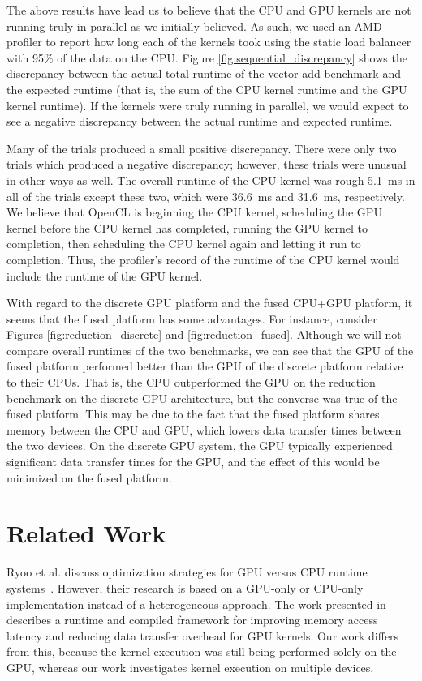 \documentclass[journal]{IEEEtran}
\begin{document}
The above results have lead us to believe that the CPU and GPU kernels are
not running truly in parallel as we initially believed.  As such, we used
an AMD profiler to report how long each of the kernels took using the static
load balancer with 95\% of the data on the CPU.  Figure \ref{fig:sequential_discrepancy}
shows the discrepancy between the actual total runtime of the vector add
benchmark and the expected runtime (that is, the sum of the CPU kernel runtime
and the GPU kernel runtime).  If the kernels were truly running in parallel,
we would expect to see a negative discrepancy between the actual runtime and
expected runtime.

Many of the trials produced a small positive discrepancy.  There were only
two trials which produced a negative discrepancy; however, these trials
were unusual in other ways as well.  The overall runtime of the CPU kernel
was rough 5.1~ms in all of the trials except these two, which were 36.6~ms
and 31.6~ms, respectively.  We believe that OpenCL is beginning the CPU
kernel, scheduling the GPU kernel before the CPU kernel has completed,
running the GPU kernel to completion, then scheduling the CPU kernel again
and letting it run to completion.  Thus, the profiler's record of the runtime
of the CPU kernel would include the runtime of the GPU kernel.

With regard to the discrete GPU platform and the fused CPU+GPU platform, it
seems that the fused platform has some advantages.  For instance, consider 
Figures \ref{fig:reduction_discrete} and \ref{fig:reduction_fused}.  Although
we will not compare overall runtimes of the two benchmarks, we can see that
the GPU of the fused platform performed better than the GPU of the discrete
platform relative to their CPUs.  That is, the CPU outperformed the GPU on
the reduction benchmark on the discrete GPU architecture, but the converse
was true of the fused platform.  This may be due to the fact that the fused
platform shares memory between the CPU and GPU, which lowers data transfer
times between the two devices.  On the discrete GPU system, the GPU typically
experienced significant data transfer times for the GPU, and the effect of
this would be minimized on the fused platform.

\section{Related Work}
Ryoo et al. discuss optimization strategies for GPU versus CPU runtime
systems~\cite{Ryoo2007}.  However, their research is based on a GPU-only
or CPU-only implementation instead of a heterogeneous approach.  The work
presented in ~\cite{Jablin2011} describes a runtime and compiled framework
for improving memory access latency and reducing data transfer overhead
for GPU kernels.  Our work differs from this, because the kernel execution
was still being performed solely on the GPU, whereas our work investigates
kernel execution on multiple devices.
\end{document}
